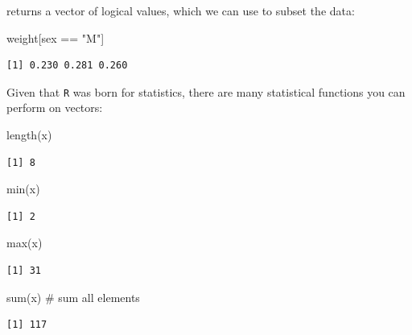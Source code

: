 \documentclass[
  letterpaper,
  DIV=11,
  numbers=noendperiod]{scrreprt}
\newenvironment{Shaded}{\begin{snugshade}}{\end{snugshade}}
\newcommand{\CommentTok}[1]{\textcolor[rgb]{0.37,0.37,0.37}{#1}}
\newcommand{\FunctionTok}[1]{\textcolor[rgb]{0.28,0.35,0.67}{#1}}
\newcommand{\NormalTok}[1]{\textcolor[rgb]{0.00,0.23,0.31}{#1}}
\newcommand{\SpecialCharTok}[1]{\textcolor[rgb]{0.37,0.37,0.37}{#1}}
\newcommand{\StringTok}[1]{\textcolor[rgb]{0.13,0.47,0.30}{#1}}
\begin{document}
returns a vector of logical values, which we can use to subset the data:

\begin{Shaded}
\begin{Highlighting}[]
\NormalTok{weight[sex }\SpecialCharTok{==} \StringTok{"M"}\NormalTok{]}
\end{Highlighting}
\end{Shaded}

\begin{verbatim}
[1] 0.230 0.281 0.260
\end{verbatim}

Given that \texttt{R} was born for statistics, there are many
statistical functions you can perform on vectors:

\begin{Shaded}
\begin{Highlighting}[]
\FunctionTok{length}\NormalTok{(x)}
\end{Highlighting}
\end{Shaded}

\begin{verbatim}
[1] 8
\end{verbatim}

\begin{Shaded}
\begin{Highlighting}[]
\FunctionTok{min}\NormalTok{(x)}
\end{Highlighting}
\end{Shaded}

\begin{verbatim}
[1] 2
\end{verbatim}

\begin{Shaded}
\begin{Highlighting}[]
\FunctionTok{max}\NormalTok{(x)}
\end{Highlighting}
\end{Shaded}

\begin{verbatim}
[1] 31
\end{verbatim}

\begin{Shaded}
\begin{Highlighting}[]
\FunctionTok{sum}\NormalTok{(x) }\CommentTok{\# sum all elements}
\end{Highlighting}
\end{Shaded}

\begin{verbatim}
[1] 117
\end{verbatim}
\end{document}
